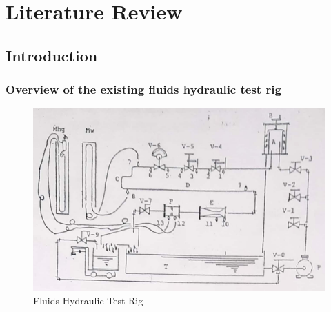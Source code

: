 \section{Literature Review}
\label{sec:review}
%

\subsection{Introduction}
\subsubsection{Overview of the existing fluids hydraulic test rig}

\begin{figure}[ht]
\includegraphics[width=0.9\linewidth]{Figures/syntheticHydroexperimentalMachine.png}
\centering
\caption{Fluids Hydraulic Test Rig }
\label{fig:fluid_hydraulic_test_rig}
\end{figure}

